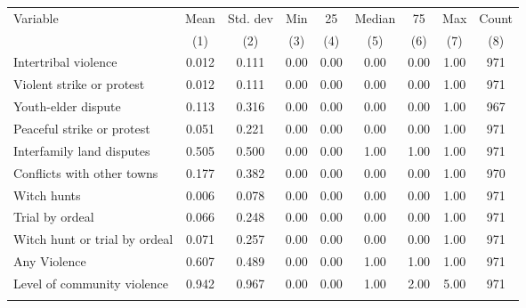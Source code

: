 \begin{tabular}{lcccccccc}
\hline \noalign{\smallskip}Variable & Mean & Std. dev & Min & 25 & Median & 75 & Max & Count\\
 & (1) & (2) & (3) & (4) & (5) & (6) & (7) & (8)\\
\noalign{\smallskip}\hline \noalign{\smallskip}\quad Intertribal violence & 0.012 & 0.111 & 0.00 & 0.00 & 0.00 & 0.00 & 1.00 & 971\\
\quad Violent strike or protest & 0.012 & 0.111 & 0.00 & 0.00 & 0.00 & 0.00 & 1.00 & 971\\
\quad Youth-elder dispute & 0.113 & 0.316 & 0.00 & 0.00 & 0.00 & 0.00 & 1.00 & 967\\
\quad Peaceful strike or protest & 0.051 & 0.221 & 0.00 & 0.00 & 0.00 & 0.00 & 1.00 & 971\\
\quad Interfamily land disputes & 0.505 & 0.500 & 0.00 & 0.00 & 1.00 & 1.00 & 1.00 & 971\\
\quad Conflicts with other towns & 0.177 & 0.382 & 0.00 & 0.00 & 0.00 & 0.00 & 1.00 & 970\\
\quad Witch hunts & 0.006 & 0.078 & 0.00 & 0.00 & 0.00 & 0.00 & 1.00 & 971\\
\quad Trial by ordeal & 0.066 & 0.248 & 0.00 & 0.00 & 0.00 & 0.00 & 1.00 & 971\\
\quad Witch hunt or trial by ordeal & 0.071 & 0.257 & 0.00 & 0.00 & 0.00 & 0.00 & 1.00 & 971\\
Any Violence & 0.607 & 0.489 & 0.00 & 0.00 & 1.00 & 1.00 & 1.00 & 971\\
Level of community violence & 0.942 & 0.967 & 0.00 & 0.00 & 1.00 & 2.00 & 5.00 & 971\\
\noalign{\smallskip}\hline\end{tabular}
